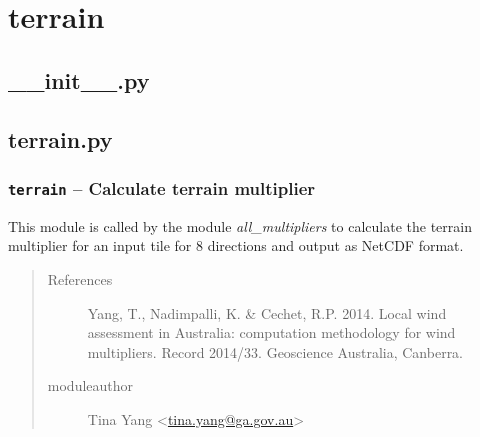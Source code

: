 \documentclass[letterpaper,10pt,english]{sphinxmanual}
\begin{document}
\section{terrain}
\label{docs/terrain:terrain}\label{docs/terrain::doc}

\subsection{\_\_init\_\_.py}
\label{docs/terrain:init-py}\label{docs/terrain:module-__init__}

\subsection{terrain.py}
\label{docs/terrain:module-terrain_mult}\label{docs/terrain:terrain-py}

\subsubsection{\texttt{terrain} -- Calculate terrain multiplier}
\label{docs/terrain:terrain-calculate-terrain-multiplier}
This module is called by the module
\emph{all\_multipliers} to calculate the terrain multiplier for an input tile
for 8 directions and output as NetCDF format.
\begin{quote}\begin{description}
\item[{References}] \leavevmode
Yang, T., Nadimpalli, K. \& Cechet, R.P. 2014. Local wind assessment
in Australia: computation methodology for wind multipliers. Record 2014/33.
Geoscience Australia, Canberra.

\item[{moduleauthor}] \leavevmode
Tina Yang \textless{}\href{mailto:tina.yang@ga.gov.au}{tina.yang@ga.gov.au}\textgreater{}

\end{description}\end{quote}

\end{document}
